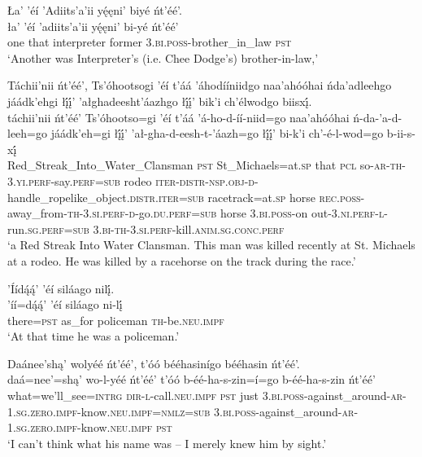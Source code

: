 \ea\label{ex:text1-29-5}
Ła’ ’éí ’Adiits’a’ii yę́ęni’ biyé ńt’éé’.\\
\gll ła’	’éí	’adiits’a’ii	yę́ęni’	bi-yé	ńt’éé’\\
     one	that	interpreter	former	3.\textsc{bi}.\textsc{poss}-brother\_in\_law	\textsc{pst}\\
\glt `Another was Interpreter's (i.e. Chee Dodge's) brother-in-law,'
\z

\ea\label{ex:text1-29-6}
Táchii’nii ńt’éé’, Ts’óhootsogi ’éí t’áá ’áhodííniidgo naa’ahóóhai ńda’adleehgo jáádk’ehgi łį́į́’ ’ałghadeesht’áazhgo łį́į́’ bik’i ch’élwodgo biisxį́.\\
\gll táchii’nii	ńt’éé’	Ts’óhootso=gi	’éí	t’áá	’á-ho-d-íí-niid=go	naa’ahóóhai	ń-da-’a-d-leeh=go	jáádk’eh=gi	łį́į́’	’ał-gha-d-eesh-t-’áazh=go	łį́į́’	bi-k’i	ch’-é-l-wod=go	b-ii-s-xį́\\
     Red\_Streak\_Into\_Water\_Clansman	\textsc{pst}	St\_Michaels=at.\textsc{sp}	that	\textsc{pcl}	so-\textsc{ar}-\textsc{th}-3.\textsc{yi}.\textsc{perf}-say.\textsc{perf}=\textsc{sub}	rodeo	\textsc{iter}-\textsc{distr}-\textsc{nsp}.\textsc{obj}-\textsc{d}-handle\_ropelike\_object.\textsc{distr}.\textsc{iter}=\textsc{sub}	racetrack=at.\textsc{sp}	horse	\textsc{rec}.\textsc{poss}-away\_from-\textsc{th}-3.\textsc{si}.\textsc{perf}-\textsc{d}-go.\textsc{du}.\textsc{perf}=\textsc{sub}	horse	3.\textsc{bi}.\textsc{poss}-on	out-3.\textsc{ni}.\textsc{perf}-\textsc{l}-run.\textsc{sg}.\textsc{perf}=\textsc{sub}	3.\textsc{bi}-\textsc{th}-3.\textsc{si}.\textsc{perf}-kill.\textsc{anim}.\textsc{sg}.\textsc{conc}.\textsc{perf}\\
\glt `a Red Streak Into Water Clansman. This man was killed recently at St. Michaels at a rodeo. He was killed by a racehorse on the track during the race.'
\z

\ea\label{ex:text1-29-7}
’Íídą́ą́’ ’éí siláago nilį́.\\
\gll ’íí=dą́ą́’	’éí	siláago	ni-lį́\\
     there=\textsc{pst}	as\_for	policeman	\textsc{th}-be.\textsc{neu}.\textsc{impf}\\
\glt `At that time he was a policeman.'
\z

\newpage
\ea\label{ex:text1-29-8}
Daánee’shą’ wolyéé ńt’éé’, t’óó bééhasinígo bééhasin ńt’éé’.\\
\gll daá=nee’=shą’	wo-l-yéé	ńt’éé’	t’óó	b-éé-ha-s-zin=í=go	b-éé-ha-s-zin	ńt’éé’\\
     what=we’ll\_see=\textsc{intrg}	\textsc{dir}-\textsc{l}-call.\textsc{neu}.\textsc{impf}	\textsc{pst}	just	3.\textsc{bi}.\textsc{poss}-against\_around-\textsc{ar}-1.\textsc{sg}.\textsc{zero}.\textsc{impf}-know.\textsc{neu}.\textsc{impf}=\textsc{nmlz}=\textsc{sub}	3.\textsc{bi}.\textsc{poss}-against\_around-\textsc{ar}-1.\textsc{sg}.\textsc{zero}.\textsc{impf}-know.\textsc{neu}.\textsc{impf}	\textsc{pst}\\
\glt `I can't think what his name was -- I merely knew him by sight.'
\z

